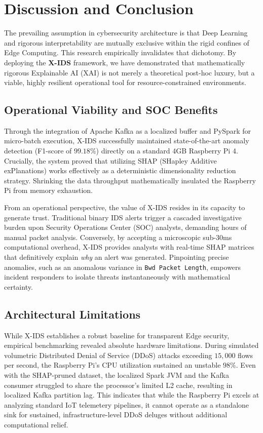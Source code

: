 \section{Discussion and Conclusion}
The prevailing assumption in cybersecurity architecture is that Deep Learning and rigorous interpretability are mutually exclusive within the rigid confines of Edge Computing. This research empirically invalidates that dichotomy. By deploying the \textbf{X-IDS} framework, we have demonstrated that mathematically rigorous Explainable AI (XAI) is not merely a theoretical post-hoc luxury, but a viable, highly resilient operational tool for resource-constrained environments.

\subsection{Operational Viability and SOC Benefits}
Through the integration of Apache Kafka as a localized buffer and PySpark for micro-batch execution, X-IDS successfully maintained state-of-the-art anomaly detection (F1-score of $99.18\%$) directly on a standard 4GB Raspberry Pi 4. Crucially, the system proved that utilizing SHAP (SHapley Additive exPlanations) works effectively as a deterministic dimensionality reduction strategy. Shrinking the data throughput mathematically insulated the Raspberry Pi from memory exhaustion. 

From an operational perspective, the value of X-IDS resides in its capacity to generate trust. Traditional binary IDS alerts trigger a cascaded investigative burden upon Security Operations Center (SOC) analysts, demanding hours of manual packet analysis. Conversely, by accepting a microscopic sub-30ms computational overhead, X-IDS provides analysts with real-time SHAP matrices that definitively explain \textit{why} an alert was generated. Pinpointing precise anomalies, such as an anomalous variance in \texttt{Bwd Packet Length}, empowers incident responders to isolate threats instantaneously with mathematical certainty.

\subsection{Architectural Limitations}
While X-IDS establishes a robust baseline for transparent Edge security, empirical benchmarking revealed absolute hardware limitations. During simulated volumetric Distributed Denial of Service (DDoS) attacks exceeding $15,000$ flows per second, the Raspberry Pi's CPU utilization sustained an unstable $98\%$. Even with the SHAP-pruned dataset, the localized Spark JVM and the Kafka consumer struggled to share the processor's limited L2 cache, resulting in localized Kafka partition lag. This indicates that while the Raspberry Pi excels at analyzing standard IoT telemetery pipelines, it cannot operate as a standalone sink for sustained, infrastructure-level DDoS deluges without additional computational relief.

